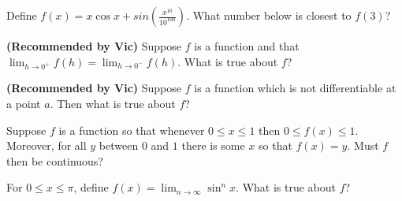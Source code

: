 \documentclass{ximera}
\newcommand{\recommendation}[1]{\textbf{(Recommended by #1)}}
\begin{document}
\begin{problem}
  Define $f(x) = x \cos x + sin\left(\frac{x^{10}}{10^{100}}\right)$.  What number below is closest to $f(3)$?
  \begin{multipleChoice}
  \end{multipleChoice}
\end{problem}

\begin{problem}

\recommendation{Vic}
  Suppose $f$ is a function and that $\lim_{h \to 0^{+}} f(h) = \lim_{h \to 0^{-}} f(h)$.  What is true about $f$?
  \begin{multipleChoice}
  \end{multipleChoice}
\end{problem}

\begin{problem}

\recommendation{Vic}
  Suppose $f$ is a function which is not differentiable at a point $a$.  Then what is true about $f$?
  \begin{multipleChoice}
  \end{multipleChoice}
\end{problem}

\begin{problem}

  Suppose $f$ is a function so that whenever $0 \leq x \leq 1$ then
  $0 \leq f(x) \leq 1$.  Moreover, for all $y$ between $0$ and $1$
  there is some $x$ so that $f(x) = y$.  Must $f$ then be continuous?
  \begin{multipleChoice}
  \end{multipleChoice}
\end{problem}

\begin{problem}

  For $0 \leq x \leq \pi$, define
  $f(x) = \lim_{n \to \infty} \sin^n x$.  What is true about $f$?
  \begin{multipleChoice}
  \end{multipleChoice}
\end{problem}
\end{document}
